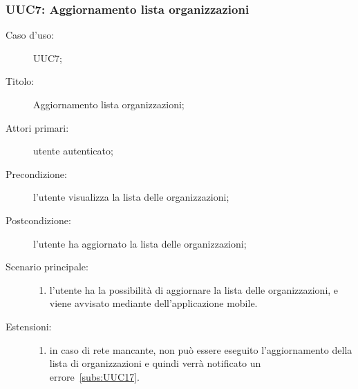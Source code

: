 \documentclass[../../../analisi-dei-requisiti.tex]{subfiles}
\begin{document}
\subsubsection{UUC7: Aggiornamento lista organizzazioni}%
\label{subs:UUC7}
\begin{description}
  \item[Caso d’uso:] UUC7;
  \item[Titolo:] Aggiornamento lista organizzazioni;
  \item[Attori primari:] utente autenticato;
  \item[Precondizione:] l'utente visualizza la lista delle organizzazioni;
  \item[Postcondizione:] l'utente ha aggiornato la lista delle organizzazioni;
  \item[Scenario principale:]
        \begin{enumerate}
          \item l'utente ha la possibilità di aggiornare la lista delle organizzazioni, e viene avvisato mediante  dell'applicazione mobile.
        \end{enumerate}
  \item[Estensioni:]
        \begin{enumerate}
          \item in caso di rete mancante, non può essere eseguito l'aggiornamento della lista di organizzazioni e quindi verrà notificato un errore~\ref{subs:UUC17}.
        \end{enumerate}
\end{description}
\end{document}
